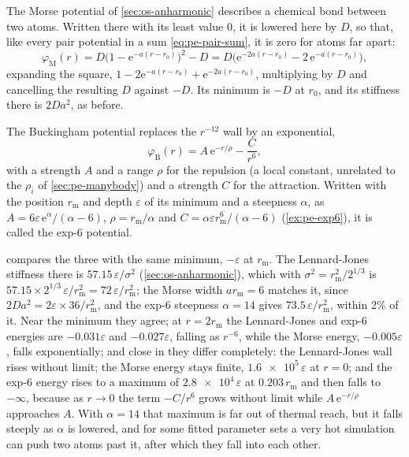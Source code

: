 The Morse potential of \cref{sec:os-anharmonic} describes a chemical bond
between two atoms\cite{Morse1929}. Written there with its least value 0,
it is lowered here by $D$, so that, like every pair potential in a sum
\cref{eq:pe-pair-sum}, it is zero for atoms far apart:
\begin{equation*}
   \varphi_{\mathrm M}(r) = D\bigl(1 - \mathrm{e}^{-a(r - r_0)}\bigr)^2 - D
   = D\bigl(\mathrm{e}^{-2a(r - r_0)} - 2\,\mathrm{e}^{-a(r - r_0)}\bigr) ,
\end{equation*}
expanding the square, $1 - 2\mathrm{e}^{-a(r-r_0)} +
\mathrm{e}^{-2a(r-r_0)}$, multiplying by $D$ and cancelling the resulting
$D$ against $-D$. Its minimum
is $-D$ at $r_0$, and its stiffness there is $2Da^2$, as before.

The Buckingham potential replaces the $r^{-12}$ wall by an exponential,
\begin{equation*}
   \varphi_{\mathrm B}(r) = A\,\mathrm{e}^{-r/\rho} - \frac{C}{r^6} ,
\end{equation*}
with a strength $A$ and a range $\rho$ for the repulsion (a local
constant, unrelated to the $\rho_i$ of \cref{sec:pe-manybody}) and a
strength $C$ for the attraction\cite{Buckingham1938}. Written with
the position $r_{\mathrm m}$ and depth $\varepsilon$ of its minimum and a
steepness $\alpha$, as $A = 6\varepsilon\,\mathrm{e}^{\alpha}/(\alpha -
6)$, $\rho = r_{\mathrm m}/\alpha$ and $C = \alpha\varepsilon r_{\mathrm
m}^6/(\alpha - 6)$ (\cref{ex:pe-exp6}), it is called the exp-6 potential.

 compares the three with the same minimum,
$-\varepsilon$ at $r_{\mathrm m}$. The Lennard-Jones stiffness there is
$57.15\,\varepsilon/\sigma^2$ (\cref{sec:os-anharmonic}), which with
$\sigma^2 = r_{\mathrm m}^2/2^{1/3}$ is $57.15\times2^{1/3}\,\varepsilon/
r_{\mathrm m}^2 = 72\,\varepsilon/r_{\mathrm m}^2$; the Morse width
$a r_{\mathrm m} = 6$ matches it, since $2Da^2 = 2\varepsilon\times36/
r_{\mathrm m}^2$, and the exp-6 steepness $\alpha = 14$ gives $73.5\,
\varepsilon/r_{\mathrm m}^2$, within 2\% of it. Near the minimum they
agree; at $r = 2r_{\mathrm m}$ the Lennard-Jones and exp-6 energies are
$-0.031\varepsilon$ and $-0.027\varepsilon$, falling as $r^{-6}$, while
the Morse energy, $-0.005\varepsilon$, falls exponentially; and close in
they differ completely: the Lennard-Jones wall rises without limit; the Morse energy
stays finite, $\num{1.6e5}\,\varepsilon$ at $r = 0$; and the exp-6 energy
rises to a maximum of $\num{2.8e4}\,\varepsilon$ at $0.203\,r_{\mathrm m}$
and then falls to $-\infty$, because as $r \to 0$ the term $-C/r^6$ grows
without limit while $A\,\mathrm{e}^{-r/\rho}$ approaches $A$. With
$\alpha = 14$ that maximum is far out of thermal reach, but it falls
steeply as $\alpha$ is lowered, and for some fitted parameter sets a very
hot simulation can push two atoms past it, after which they fall into
each other.

